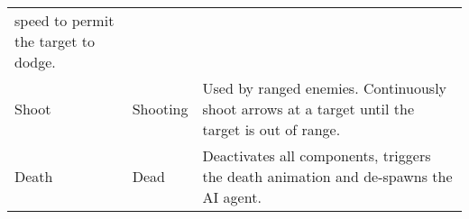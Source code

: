 \begin{table}[!h]
\begin{center}
\begin{tabular}{ >{\small}w{l}{6em} >{\small}w{l}{7em} >{\small}m{17em} }
                                               speed to permit the target to dodge.         \\
        Shoot          & Shooting            & Used by ranged enemies. Continuously shoot 
                                               arrows at a target until the target is 
                                               out of range.                                \\
        Death          & Dead                & Deactivates all components, triggers the 
                                               death animation and de-spawns the AI agent.  \\
        \bottomrule
      \end{tabular}
    \end{center}
  \end{table}